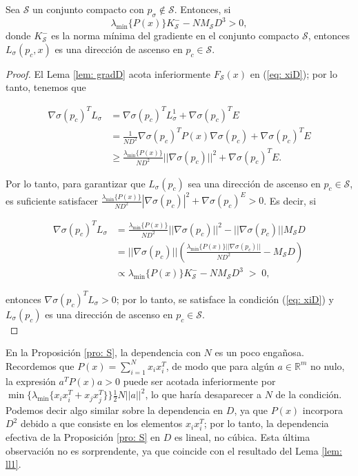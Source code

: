 \begin{prop} \label{pro: S}
Sea $\mathcal{S}$ un conjunto compacto con $p_\sigma \notin \mathcal{S}$. Entonces, si
\begin{equation}
\lambda_{\text{min}}\{P(x)\} K^-_\mathcal{S} - NM_\mathcal{S}D^3 > 0, \nonumber
\end{equation}
donde $K^-_\mathcal{S}$ es la norma mínima del gradiente en el conjunto compacto $\mathcal{S}$, entonces $L_\sigma(p_c, x)$ es una dirección de ascenso en $p_c \in \mathcal{S}$.
\end{prop}
\begin{proof}
El Lema \ref{lem: gradD} acota inferiormente $F_\mathcal{S}(x)$ en (\ref{eq: xiD}); por lo tanto, tenemos que
    
\begin{align}
\nabla\sigma(p_c)^TL_\sigma &= \nabla\sigma(p_c)^TL^1_\sigma + \nabla\sigma(p_c)^TE \nonumber \\
&= \frac{1}{ND^2}\nabla\sigma(p_c)^TP(x)\nabla\sigma(p_c) + \nabla\sigma(p_c)^TE \nonumber \\
&\geq \frac{\lambda_{\text{min}}\{P(x)\}}{ND^2} ||\nabla\sigma(p_c)||^2 + \nabla\sigma(p_c)^TE.
\nonumber
\end{align}

Por lo tanto, para garantizar que $L_\sigma(p_c)$ sea una dirección de ascenso en $p_c\in\mathcal{S}$, es suficiente satisfacer $\frac{\lambda_{\text{min}}\{P(x)\}}{ND^2} |\nabla\sigma(p_c)|^2 + \nabla\sigma(p_c)^E > 0$. Es decir, si

\newpage

\begin{align}
\nabla\sigma(p_c)^TL_\sigma &= \frac{\lambda_{\text{min}}\{P(x)\}}{ND^2} ||\nabla\sigma(p_c)||^2 - ||\nabla\sigma(p_c)||M_\mathcal{S}D \nonumber \\
&= ||\nabla\sigma(p_c)||\left(\frac{\lambda_{\text{min}}\{P(x)\} ||\nabla\sigma(p_c)|| }{ND^2} - M_\mathcal{S}D \right) \nonumber \\
&\propto \lambda_{\text{min}}\{P(x)\} K^-_\mathcal{S} - NM_\mathcal{S}D^3 \; > \; 0, \nonumber
\end{align}

entonces $\nabla\sigma(p_c)^TL_\sigma > 0$; por lo tanto, se satisface la condición (\ref{eq: xiD}) y $L_\sigma(p_c)$ es una dirección de ascenso en $p_c\in\mathcal{S}$. \\
\end{proof}

En la Proposición \ref{pro: S}, la dependencia con $N$ es un poco engañosa. Recordemos que $P(x) = \sum_{i=1}^Nx_ix_i^T$, de modo que para algún $a\in\mathbb{R}^m$ no nulo, la expresión $a^T P(x) a > 0$ puede ser acotada inferiormente por ${\operatorname{min}}\{\lambda_\text{min}\{x_ix_i^T + x_jx_j^T\}\} \frac{1}{2}N||a||^2$, lo que haría desaparecer a $N$ de la condición. Podemos decir algo similar sobre la dependencia en $D$, ya que $P(x)$ incorpora $D^2$ debido a que consiste en los elementos $x_ix_i^T$; por lo tanto, la dependencia efectiva de la Proposición \ref{pro: S} en $D$ es lineal, no cúbica. Esta última observación no es sorprendente, ya que coincide con el resultado del Lema \ref{lem: ll1}.

